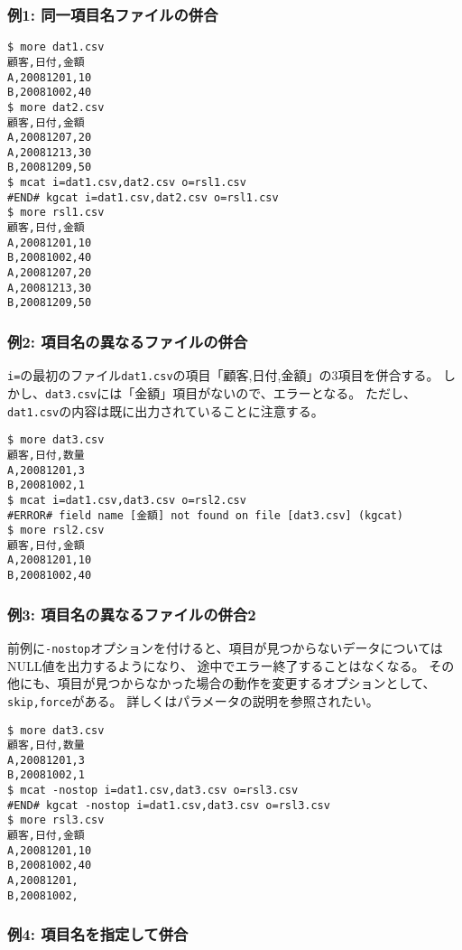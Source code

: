 \subsubsection*{例1: 同一項目名ファイルの併合}



\begin{Verbatim}[baselinestretch=0.7,frame=single]
$ more dat1.csv
顧客,日付,金額
A,20081201,10
B,20081002,40
$ more dat2.csv
顧客,日付,金額
A,20081207,20
A,20081213,30
B,20081209,50
$ mcat i=dat1.csv,dat2.csv o=rsl1.csv
#END# kgcat i=dat1.csv,dat2.csv o=rsl1.csv
$ more rsl1.csv
顧客,日付,金額
A,20081201,10
B,20081002,40
A,20081207,20
A,20081213,30
B,20081209,50
\end{Verbatim}
\subsubsection*{例2: 項目名の異なるファイルの併合}

\verb|i=|の最初のファイル\verb|dat1.csv|の項目「顧客,日付,金額」の3項目を併合する。
しかし、\verb|dat3.csv|には「金額」項目がないので、エラーとなる。
ただし、\verb|dat1.csv|の内容は既に出力されていることに注意する。


\begin{Verbatim}[baselinestretch=0.7,frame=single]
$ more dat3.csv
顧客,日付,数量
A,20081201,3
B,20081002,1
$ mcat i=dat1.csv,dat3.csv o=rsl2.csv
#ERROR# field name [金額] not found on file [dat3.csv] (kgcat)
$ more rsl2.csv
顧客,日付,金額
A,20081201,10
B,20081002,40
\end{Verbatim}
\subsubsection*{例3: 項目名の異なるファイルの併合2}

前例に\verb|-nostop|オプションを付けると、項目が見つからないデータについてはNULL値を出力するようになり、
途中でエラー終了することはなくなる。
その他にも、項目が見つからなかった場合の動作を変更するオプションとして、\verb|skip,force|がある。
詳しくはパラメータの説明を参照されたい。


\begin{Verbatim}[baselinestretch=0.7,frame=single]
$ more dat3.csv
顧客,日付,数量
A,20081201,3
B,20081002,1
$ mcat -nostop i=dat1.csv,dat3.csv o=rsl3.csv
#END# kgcat -nostop i=dat1.csv,dat3.csv o=rsl3.csv
$ more rsl3.csv
顧客,日付,金額
A,20081201,10
B,20081002,40
A,20081201,
B,20081002,
\end{Verbatim}
\subsubsection*{例4: 項目名を指定して併合}

